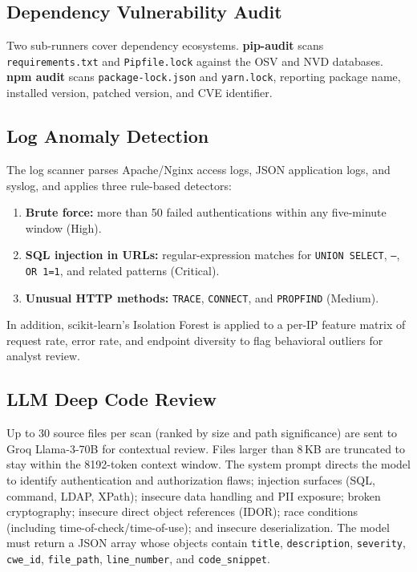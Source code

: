 \documentclass[conference]{IEEEtran}
\begin{document}
\subsection{Dependency Vulnerability Audit}
Two sub-runners cover dependency ecosystems. \textbf{pip-audit} scans
\texttt{requirements.txt} and \texttt{Pipfile.lock} against the OSV and NVD
databases. \textbf{npm audit} scans \texttt{package-lock.json} and
\texttt{yarn.lock}, reporting package name, installed version, patched version,
and CVE identifier.

\subsection{Log Anomaly Detection}
The log scanner parses Apache/Nginx access logs, JSON application logs, and
syslog, and applies three rule-based detectors:
\begin{enumerate}[leftmargin=*,nosep,label=\arabic*)]
  \item \textbf{Brute force:} more than 50 failed authentications within any
  five-minute window (High).
  \item \textbf{SQL injection in URLs:} regular-expression matches for
  \texttt{UNION SELECT}, \texttt{--}, \texttt{OR 1=1}, and related patterns
  (Critical).
  \item \textbf{Unusual HTTP methods:} \texttt{TRACE}, \texttt{CONNECT}, and
  \texttt{PROPFIND} (Medium).
\end{enumerate}
In addition, scikit-learn's Isolation Forest is applied to a per-IP feature
matrix of request rate, error rate, and endpoint diversity to flag behavioral
outliers for analyst review.

\subsection{LLM Deep Code Review}
Up to 30 source files per scan (ranked by size and path significance) are sent
to Groq Llama-3-70B for contextual review. Files larger than 8\,KB are truncated
to stay within the 8192-token context window. The system prompt directs the model
to identify authentication and authorization flaws; injection surfaces (SQL,
command, LDAP, XPath); insecure data handling and PII exposure; broken
cryptography; insecure direct object references (IDOR); race conditions
(including time-of-check/time-of-use); and insecure deserialization. The model
must return a JSON array whose objects contain \texttt{title},
\texttt{description}, \texttt{severity}, \texttt{cwe\_id}, \texttt{file\_path},
\texttt{line\_number}, and \texttt{code\_snippet}.
\end{document}
